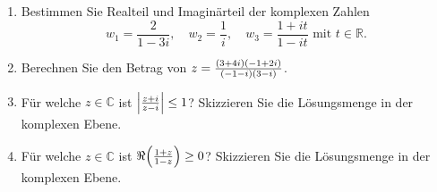 \documentclass[german,12pt]{homework}
\DeclarePairedDelimiter{\absolute}{\lvert}{\rvert}
\DeclarePairedDelimiter{\enbrace}{(}{)}
\begin{document}
    \begin{problem}
        \begin{enumerate}
            \item Bestimmen Sie Realteil und Imaginärteil der komplexen Zahlen
            \[w_1 = \frac{2}{1 - 3i}, \quad w_2 = \frac{1}{i}, \quad w_3 = \frac{1 + it}{1 - it} \text{ mit }t \in \mathbb{R}.\]
            \item Berechnen Sie den Betrag von \(z = \frac{\enbrace*{3 + 4i}\enbrace*{-1 + 2i}}{\enbrace*{-1 - i}\enbrace*{3 - i}}\).
            \item Für welche \(z \in \mathbb{C}\) ist \(\absolute*{\frac{z + i}{z - i}} \le 1\)? Skizzieren Sie die Lösungsmenge in der komplexen Ebene.
            \item Für welche \(z \in \mathbb{C}\) ist \(\Re\enbrace*{\frac{1 + z}{1 - z}} \ge 0\)? Skizzieren Sie die Lösungsmenge in der komplexen Ebene.
        \end{enumerate}
    \end{problem}
\end{document}
